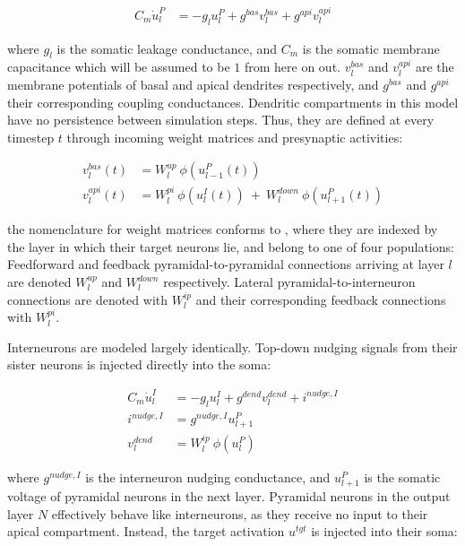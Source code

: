 \begin{align}
  C_m \dot{u}_l^P & = - g_l u_l^{P} + g^{bas} v_l^{bas} + g^{api} v_l^{api} \label{eq-pyr-dynamics-rate}
\end{align}

where $g_l$ is the somatic leakage conductance, and $C_m$ is the somatic membrane capacitance which will be assumed to
be $1$ from here on out. $v_l^{bas}$ and $v_l^{api}$ are the membrane potentials of basal and apical dendrites
respectively, and $g^{bas}$ and $g^{api}$ their corresponding coupling conductances.  Dendritic compartments in this
model have no persistence between simulation steps. Thus, they are defined at every timestep $t$ through incoming weight
matrices and presynaptic activities:

\begin{align}
  v_l^{bas}(t) & = W_l^{up} \ \phi(u_{l-1}^P(t)) \label{eq-v-bas-rate}                                     \\
  v_l^{api}(t) & =  W_l^{pi} \ \phi(u_l^I(t)) \ + \  W_l^{down} \ \phi(u_{l+1}^P(t)) \label{eq-v-api-rate}
\end{align}

the nomenclature for weight matrices conforms to \citep{Haider2021}, where they are indexed by the layer in which their
target neurons lie, and belong to one of four populations: Feedforward and feedback pyramidal-to-pyramidal connections
arriving at layer $l$ are denoted $W_l^{up}$ and $W_l^{down}$ respectively. Lateral pyramidal-to-interneuron connections
are denoted with $W_l^{ip}$ and their corresponding feedback connections with $W_l^{pi}$.

Interneurons are modeled largely identically. Top-down nudging signals from their sister neurons is injected directly
into the soma:

\begin{align}
  C_m \dot{u}_l^I & = - g_l u_l^{I} + g^{dend} v_l^{dend} + i^{nudge, I}\label{eq-intn-dynamics} \\
  i^{nudge, I}    & = g^{nudge, I} u_{l+1}^P                                                     \\
  v_l^{dend}      & = W_l^{ip} \ \phi(u_{l}^P)
\end{align}

where $ g^{nudge, I}$ is the interneuron nudging conductance, and $u_{l+1}^P$ is the somatic voltage of pyramidal
neurons in the next layer.  Pyramidal neurons in the output layer $N$ effectively behave like interneurons, as they
receive no input to their apical compartment. Instead, the target  activation $u^{tgt}$ is injected into their soma:

